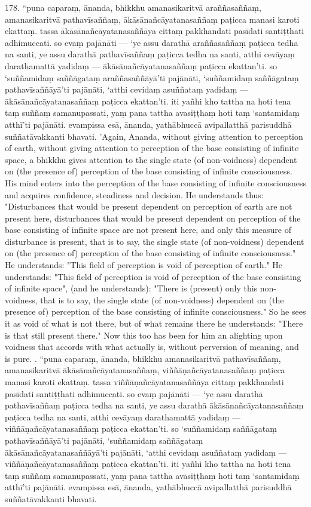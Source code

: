 \documentclass[11pt]{article}
\begin{document}
\begin{paracol}{2}
\begin{column}
 178. “puna caparaṃ, ānanda, bhikkhu amanasikaritvā araññasaññaṃ, amanasikaritvā pathavīsaññaṃ, ākāsānañcāyatanasaññaṃ paṭicca manasi karoti ekattaṃ. tassa ākāsānañcāyatanasaññāya cittaṃ pakkhandati pasīdati santiṭṭhati adhimuccati. so evaṃ pajānāti — ‘ye assu darathā araññasaññaṃ paṭicca tedha na santi, ye assu darathā pathavīsaññaṃ paṭicca tedha na santi, atthi cevāyaṃ darathamattā yadidaṃ — ākāsānañcāyatanasaññaṃ paṭicca ekattan’ti. so ‘suññamidaṃ saññāgataṃ araññasaññāyā’ti pajānāti, ‘suññamidaṃ saññāgataṃ pathavīsaññāyā’ti pajānāti, ‘atthi cevidaṃ asuññataṃ yadidaṃ — ākāsānañcāyatanasaññaṃ paṭicca ekattan’ti. iti yañhi kho tattha na hoti tena taṃ suññaṃ samanupassati, yaṃ pana tattha avasiṭṭhaṃ hoti taṃ ‘santamidaṃ atthī’ti pajānāti. evampissa esā, ānanda, yathābhuccā avipallatthā parisuddhā suññatāvakkanti bhavati.
\switchcolumn*
'Again, Ananda, without giving attention to perception of earth, without giving attention to perception of the base consisting of infinite space, a bhikkhu gives attention to the single state (of non-voidness) dependent on (the presence of) perception of the base consisting of infinite consciousness. His mind enters into the perception of the base consisting of infinite consciousness and acquires confidence, steadiness and decision. He understands thus: "Disturbances that would be present dependent on perception of earth are not present here, disturbances that would be present dependent on perception of the base consisting of infinite space are not present here, and only this measure of disturbance is present, that is to say, the single state (of non-voidness) dependent on (the presence of) perception of the base consisting of infinite consciousness." He understands: "This field of perception is void of perception of earth." He understands: "This field of perception is void of perception of the base consisting of infinite space", (and he understands): "There is (present) only this non-voidness, that is to say, the single state (of non-voidness) dependent on (the presence of) perception of the base consisting of infinite consciousness." So he sees it as void of what is not there, but of what remains there he understands: "There is that still present there." Now this too has been for him an alighting upon voidness that accords with what actually is, without perversion of meaning, and is pure.
. “puna caparaṃ, ānanda, bhikkhu amanasikaritvā pathavīsaññaṃ, amanasikaritvā ākāsānañcāyatanasaññaṃ, viññāṇañcāyatanasaññaṃ paṭicca manasi karoti ekattaṃ. tassa viññāṇañcāyatanasaññāya cittaṃ pakkhandati pasīdati santiṭṭhati adhimuccati. so evaṃ pajānāti — ‘ye assu darathā pathavīsaññaṃ paṭicca tedha na santi, ye assu darathā ākāsānañcāyatanasaññaṃ paṭicca tedha na santi, atthi cevāyaṃ darathamattā yadidaṃ — viññāṇañcāyatanasaññaṃ paṭicca ekattan’ti. so ‘suññamidaṃ saññāgataṃ pathavīsaññāyā’ti pajānāti, ‘suññamidaṃ saññāgataṃ ākāsānañcāyatanasaññāyā’ti pajānāti, ‘atthi cevidaṃ asuññataṃ yadidaṃ — viññāṇañcāyatanasaññaṃ paṭicca ekattan’ti. iti yañhi kho tattha na hoti tena taṃ suññaṃ samanupassati, yaṃ pana tattha avasiṭṭhaṃ hoti taṃ ‘santamidaṃ atthī’ti pajānāti. evampissa esā, ānanda, yathābhuccā avipallatthā parisuddhā suññatāvakkanti bhavati.

\end{column}
\end{paracol}
\end{document}
